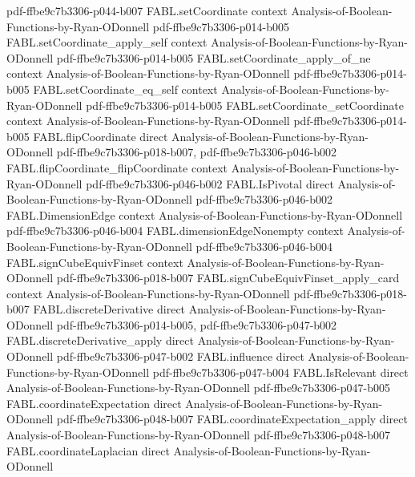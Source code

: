 \begin{theorem}
  {pdf-ffbe9c7b3306-p044-b007}
\proofstep
  {FABL.setCoordinate}
  {context}
  {Analysis-of-Boolean-Functions-by-Ryan-ODonnell}
  {pdf-ffbe9c7b3306-p014-b005}
\proofstep
  {FABL.setCoordinate_apply_self}
  {context}
  {Analysis-of-Boolean-Functions-by-Ryan-ODonnell}
  {pdf-ffbe9c7b3306-p014-b005}
\proofstep
  {FABL.setCoordinate_apply_of_ne}
  {context}
  {Analysis-of-Boolean-Functions-by-Ryan-ODonnell}
  {pdf-ffbe9c7b3306-p014-b005}
\proofstep
  {FABL.setCoordinate_eq_self}
  {context}
  {Analysis-of-Boolean-Functions-by-Ryan-ODonnell}
  {pdf-ffbe9c7b3306-p014-b005}
\proofstep
  {FABL.setCoordinate_setCoordinate}
  {context}
  {Analysis-of-Boolean-Functions-by-Ryan-ODonnell}
  {pdf-ffbe9c7b3306-p014-b005}
\proofstep
  {FABL.flipCoordinate}
  {direct}
  {Analysis-of-Boolean-Functions-by-Ryan-ODonnell}
  {pdf-ffbe9c7b3306-p018-b007,
    pdf-ffbe9c7b3306-p046-b002}
\proofstep
  {FABL.flipCoordinate_flipCoordinate}
  {context}
  {Analysis-of-Boolean-Functions-by-Ryan-ODonnell}
  {pdf-ffbe9c7b3306-p046-b002}
\proofstep
  {FABL.IsPivotal}
  {direct}
  {Analysis-of-Boolean-Functions-by-Ryan-ODonnell}
  {pdf-ffbe9c7b3306-p046-b002}
\proofstep
  {FABL.DimensionEdge}
  {context}
  {Analysis-of-Boolean-Functions-by-Ryan-ODonnell}
  {pdf-ffbe9c7b3306-p046-b004}
\proofstep
  {FABL.dimensionEdgeNonempty}
  {context}
  {Analysis-of-Boolean-Functions-by-Ryan-ODonnell}
  {pdf-ffbe9c7b3306-p046-b004}
\proofstep
  {FABL.signCubeEquivFinset}
  {context}
  {Analysis-of-Boolean-Functions-by-Ryan-ODonnell}
  {pdf-ffbe9c7b3306-p018-b007}
\proofstep
  {FABL.signCubeEquivFinset_apply_card}
  {context}
  {Analysis-of-Boolean-Functions-by-Ryan-ODonnell}
  {pdf-ffbe9c7b3306-p018-b007}
\proofstep
  {FABL.discreteDerivative}
  {direct}
  {Analysis-of-Boolean-Functions-by-Ryan-ODonnell}
  {pdf-ffbe9c7b3306-p014-b005,
    pdf-ffbe9c7b3306-p047-b002}
\proofstep
  {FABL.discreteDerivative_apply}
  {direct}
  {Analysis-of-Boolean-Functions-by-Ryan-ODonnell}
  {pdf-ffbe9c7b3306-p047-b002}
\proofstep
  {FABL.influence}
  {direct}
  {Analysis-of-Boolean-Functions-by-Ryan-ODonnell}
  {pdf-ffbe9c7b3306-p047-b004}
\proofstep
  {FABL.IsRelevant}
  {direct}
  {Analysis-of-Boolean-Functions-by-Ryan-ODonnell}
  {pdf-ffbe9c7b3306-p047-b005}
\proofstep
  {FABL.coordinateExpectation}
  {direct}
  {Analysis-of-Boolean-Functions-by-Ryan-ODonnell}
  {pdf-ffbe9c7b3306-p048-b007}
\proofstep
  {FABL.coordinateExpectation_apply}
  {direct}
  {Analysis-of-Boolean-Functions-by-Ryan-ODonnell}
  {pdf-ffbe9c7b3306-p048-b007}
\proofstep
  {FABL.coordinateLaplacian}
  {direct}
  {Analysis-of-Boolean-Functions-by-Ryan-ODonnell}

\end{theorem}
